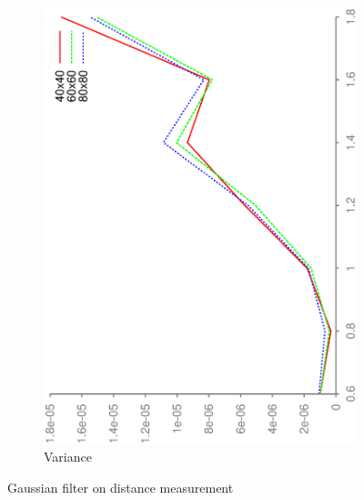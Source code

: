 \documentclass[DIV12,a4paper]{scrartcl}
\begin{document}
\begin{figure}[h!tbp]
\begin{subfigure}[b]{.5\textwidth}
    \includegraphics[height=\textwidth, angle=270]{figures/mean_gauss_variance.eps}
    \caption{Variance}
  \end{subfigure}
  \caption{Gaussian filter on distance measurement}
  \label{fig:gauss_noise}
\end{figure}
\end{document}
